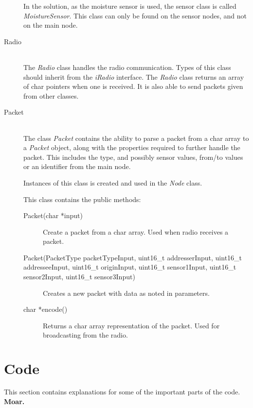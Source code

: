 \begin{description}
In the solution, as the moisture sensor is used, the sensor class is called \textit{MoistureSensor}. This class can only be found on the sensor nodes, and not on the main node.


\item[Radio] \hfill \\
The \textit{Radio} class handles the radio communication. Types of this class should inherit from the \textit{iRadio} interface. The \textit{Radio} class returns an array of char pointers when one is received. It is also able to send packets given from other classes.

\item[Packet] \hfill \\
The class \textit{Packet} contains the ability to parse a packet from a char array to a \textit{Packet} object, along with the properties required to further handle the packet. This includes the type, and possibly sensor values, from/to values or an identifier from the main node.

Instances of this class is created and used in the \textit{Node} class.

This class contains the public methods:
\begin{description}
\item[Packet(char *input)] Create a packet from a char array. Used when radio receives a packet.
\item[Packet(PacketType packetTypeInput, uint16\_t addresserInput, uint16\_t addresseeInput, uint16\_t originInput, uint16\_t sensor1Input, uint16\_t sensor2Input, uint16\_t sensor3Input)] Creates a new packet with data as noted in parameters.
\item[char *encode()] Returns a char array representation of the packet. Used for broadcasting from the radio.
\end{description}

\end{description}


\section{Code}
This section contains explanations for some of the important parts of the code.
\textbf{Moar.}




